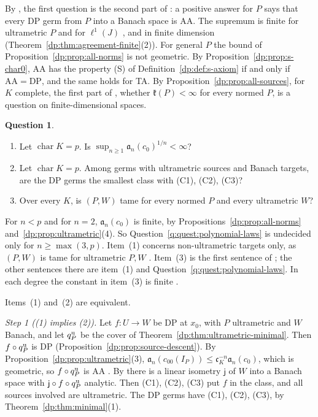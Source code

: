 \documentclass[11pt]{amsart}
\theoremstyle{definition}
\theoremstyle{remark}
\numberwithin{equation}{section}
\theoremstyle{plain}
\theoremstyle{definition}
\newtheorem{question}[theorem]{Question}
\theoremstyle{plain}
\begin{document}
By \cite[Proposition~14.37]{I}, the first question is the second part of \cite[Question~14.42(1)]{I}: a positive answer for $P$ says that every DP germ from $P$ into a Banach space is AA. The supremum is finite for ultrametric $P$ and for $\ell^1(J)$ \cite[Theorem~14.39(2),(3)]{I}, and in finite dimension (Theorem~\ref{dp:thm:agreement-finite}(2)). For general $P$ the bound of Proposition~\ref{dp:prop:all-norms} is not geometric. By Proposition~\ref{dp:prop:s-char0}, AA has the property (S) of Definition~\ref{dp:def:s-axiom} if and only if $\mathrm{AA}=\mathrm{DP}$, and the same holds for TA. By Proposition~\ref{dp:prop:all-sources}, for $K$ complete, the first part of \cite[Question~14.42(1)]{I}, whether $\mathfrak k(P)<\infty$ for every normed $P$, is a question on finite-dimensional spaces.

\begin{question}\label{dp:q:c0}
\leavevmode
\begin{enumerate}
\item Let $\operatorname{char}K=p$. Is $\sup_{n\ge1}\mathfrak a_n(c_0)^{1/n}<\infty$?
\item Let $\operatorname{char}K=p$. Among germs with ultrametric sources and Banach targets, are the DP germs the smallest class with \textup{(C1), (C2), (C3)}?
\item Over every $K$, is $(P,W)$ tame for every normed $P$ and every ultrametric $W$?
\end{enumerate}
\end{question}

For $n<p$ and for $n=2$, $\mathfrak a_n(c_0)$ is finite, by Propositions~\ref{dp:prop:all-norms} and~\ref{dp:prop:ultrametric}(4). So Question~\ref{q:quest:polynomial-laws} is undecided only for $n\ge\max(3,p)$. Item~(1) concerns non-ultrametric targets only, as $(P,W)$ is tame for ultrametric $P,W$ \cite[Theorem~14.39(1)]{I}. Item~(3) is the first sentence of \cite[Question~14.42(4)]{I}; the other sentences there are item~(1) and Question~\ref{q:quest:polynomial-laws}. In each degree the constant in item~(3) is finite \cite[Theorem~14.39(4)]{I}.

Items~(1) and~(2) are equivalent.

\emph{Step 1 ((1) implies (2)).} Let $f\colon U\to W$ be DP at $x_0$, with $P$ ultrametric and $W$ Banach, and let $q^{\rm u}_P$ be the cover of Theorem~\ref{dp:thm:ultrametric-minimal}. Then $f\circ q^{\rm u}_P$ is DP (Proposition~\ref{dp:prop:source-descent}). By Proposition~\ref{dp:prop:ultrametric}(3), $\mathfrak a_n(c_{00}(I_P))\le\mathfrak c_K^{-n}\mathfrak a_n(c_0)$, which is geometric, so $f\circ q^{\rm u}_P$ is AA \cite[Theorem~14.38(1)]{I}. By \cite[Theorem~14.11]{I} there is a linear isometry $\mathsf j$ of $W$ into a Banach space with $\mathsf j\circ f\circ q^{\rm u}_P$ analytic. Then (C1), (C2), (C3) put $f$ in the class, and all sources involved are ultrametric. The DP germs have (C1), (C2), (C3), by Theorem~\ref{dp:thm:minimal}(1).
\end{document}
